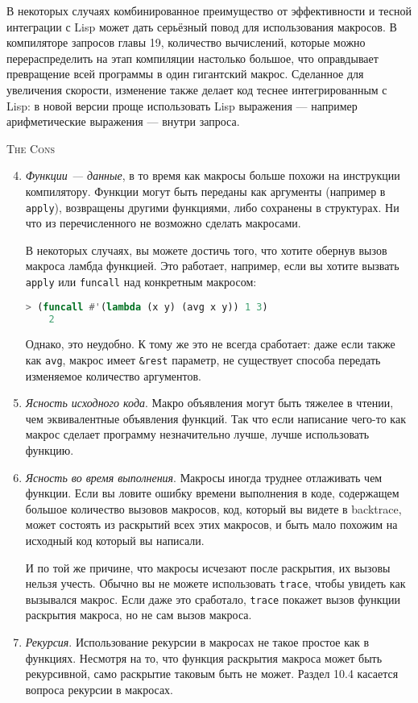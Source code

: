 \documentclass[12pt, a4paper]{article} %
\begin{document}
В некоторых случаях комбинированное преимущество от эффективности и тесной интеграции с Lisp может дать серьёзный повод для использования макросов. В компиляторе запросов главы 19,  количество вычислений, которые можно перераспределить на этап компиляции настолько большое, что оправдывает превращение всей программы в один гигантский макрос. Сделанное для увеличения скорости, изменение также делает код теснее интегрированным с Lisp: в новой версии проще использовать Lisp выражения --- например арифметические выражения --- внутри запроса.

\begin{center}
    \textsc{The Cons}
\end{center}

\begin{enumerate} \setcounter{enumi}{3}
    \item \textit{Функции --- данные}, в то время как макросы больше похожи на инструкции компилятору. Функции могут быть переданы как аргументы (например в \texttt{apply}), возвращены другими функциями, либо сохранены в структурах. Ни что из перечисленного не возможно сделать макросами. 

    В некоторых случаях, вы можете достичь того, что хотите обернув вызов макроса ламбда функцией. Это работает, например, если вы хотите вызвать \texttt{apply} или \texttt{funcall} над конкретным макросом:
\begin{lstlisting}[language=Lisp]
    > (funcall #'(lambda (x y) (avg x y)) 1 3)
    2
\end{lstlisting}
    Однако, это неудобно. К тому же это не всегда сработает: даже если также как \texttt{avg}, макрос имеет \texttt{\&rest} параметр, не существует способа передать изменяемое количество аргументов.

    \item \textit{Ясность исходного кода}. Макро объявления могут быть тяжелее в чтении, чем эквивалентные объявления функций. Так что если написание чего-то как макрос сделает программу незначительно лучше, лучше использовать функцию.

    \item \textit{Ясность во время выполнения}. Макросы иногда труднее отлаживать чем функции. Если вы ловите ошибку времени выполнения в коде, содержащем большое количество вызовов макросов, код, который вы видете в backtrace, может состоять из раскрытий всех этих макросов, и быть мало похожим на исходный код который вы написали.

    И по той же причине, что макросы исчезают после раскрытия, их вызовы нельзя учесть. Обычно вы не можете использовать \texttt{trace}, чтобы увидеть как вызывался макрос. Если даже это сработало, \texttt{trace} покажет вызов функции раскрытия макроса, но не сам вызов макроса.

    \item \textit{Рекурсия}. Использование рекурсии в макросах не такое простое как в функциях. Несмотря на то, что функция раскрытия макроса может быть рекурсивной, само раскрытие таковым быть не может. Раздел 10.4 касается вопроса рекурсии в макросах.
\end{enumerate}
\end{document}
